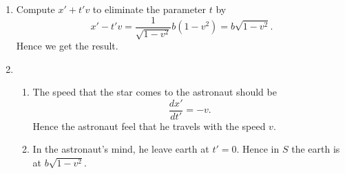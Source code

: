 \begin{enumerate}
\begin{enumerate}
\item Compute $x'+t'v$ to eliminate the parameter $t$ by 
\[x'-t'v=\frac{1}{\sqrt{1-v^2}}b(1-v^2)=b\sqrt{1-v^2}.\]
Hence we get the result.
\item \begin{enumerate}
\item The speed that the star comes to the astronaut should be 
\[\frac{dx'}{dt'}=-v.\]
Hence the astronaut feel that he travels with the speed $v$.
\item In the astronaut's mind, he leave earth at $t'=0$. Hence in $S$ the earth is at $b\sqrt{1-v^2}$.
\end{enumerate}
\end{enumerate}
\end{enumerate}